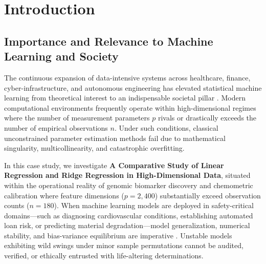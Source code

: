 \section{Introduction}

\subsection{Importance and Relevance to Machine Learning and Society}
The continuous expansion of data-intensive systems across healthcare, finance, cyber-infrastructure, and autonomous engineering has elevated statistical machine learning from theoretical interest to an indispensable societal pillar \cite{hastie2009}. Modern computational environments frequently operate within high-dimensional regimes where the number of measurement parameters $p$ rivals or drastically exceeds the number of empirical observations $n$. Under such conditions, classical unconstrained parameter estimation methods fail due to mathematical singularity, multicollinearity, and catastrophic overfitting.

In this case study, we investigate \textbf{A Comparative Study of Linear Regression and Ridge Regression in High-Dimensional Data}, situated within the operational reality of genomic biomarker discovery and chemometric calibration where feature dimensions ($p=2,400$) substantially exceed observation counts ($n=180$). When machine learning models are deployed in safety-critical domains---such as diagnosing cardiovascular conditions, establishing automated loan risk, or predicting material degradation---model generalization, numerical stability, and bias-variance equilibrium are imperative \cite{breiman2001}. Unstable models exhibiting wild swings under minor sample permutations cannot be audited, verified, or ethically entrusted with life-altering determinations.

